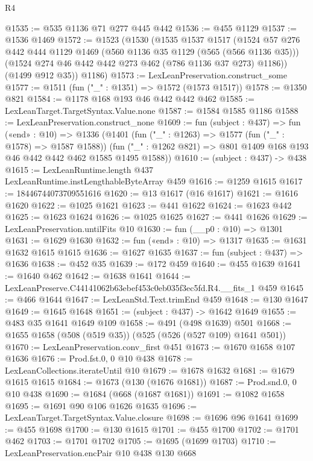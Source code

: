 \begin{lexlean}{R4}
\begin{coremodule}
@1535 := @535 @1136 @71 @277 @445 @442
@1536 := @455 @1129
@1537 := @1536 @1469
@1572 := @1523
    (@1530
      (@1535
        @1537
        @1517
        (@1524
          @57
          @276
          @442
          @444
          @1129
          @1469
          (@560 @1136 @35 @1129 (@565 (@566 @1136 @35)))
          (@1524 @274 @46 @442 @442 @273 @462 (@786 @1136 @37 @273) @1186))
        (@1499 @912 @35))
      @1186)
@1573 := LexLeanPreservation.construct_some
@1577 := @1511 (fun ("_" : @1351) => @1572 (@1573 @1517))
@1578 := @1350 @821
@1584 := @1178 @168 @193 @46 @442 @442 @462
@1585 := LexLeanTarget.TargetSyntax.Value.none
@1587 := @1584 @1585 @1186
@1588 := LexLeanPreservation.construct_none
@1609 := fun (subject : @437) =>
  fun («end» : @10) =>
  @1336
    (@1401
      (fun ("_" : @1263) => @1577 (fun ("_" : @1578) => @1587 @1588))
      (fun ("_" : @1262 @821) => @801 @1409 @168 @193 @46 @442 @442 @462 @1585 @1495 @1588))
@1610 := (subject : @437) -> @438
@1615 := LexLeanRuntime.length @437 LexLeanRuntime.instLengthableByteArray @459
@1616 := @1259 @1615
@1617 := 18446744073709551616
@1620 := @13 @1617 (@16 @1617)
@1621 := @1616 @1620
@1622 := @1025 @1621
@1623 := @441 @1622
@1624 := @1623 @442
@1625 := @1623 @1624
@1626 := @1025 @1625
@1627 := @441 @1626
@1629 := LexLeanPreservation.untilFits @10
@1630 := fun (__p0 : @10) => @1301
@1631 := @1629 @1630
@1632 := fun («end» : @10) => @1317
@1635 := @1631 @1632 @1615 @1615
@1636 := @1627 @1635
@1637 := fun (subject : @437) => @1636
@1638 := @452 @35
@1639 := @172 @459
@1640 := @455 @1639
@1641 := @1640 @462
@1642 := @1638 @1641
@1644 := LexLeanPreserve.C44141062b63ebef453c0eb035f3ec5fd.R4.__fits_1 @459
@1645 := @466 @1644
@1647 := LexLeanStd.Text.trimEnd @459
@1648 := @130 @1647
@1649 := @1645 @1648
@1651 := (subject : @437) -> @1642 @1649
@1655 := @483 @35 @1641 @1649 @109
@1658 := @491 (@498 @1639) @501
@1668 := @1655 @1658 (@508 (@519 @35)) (@525 (@526 (@527 @109) @1641 @501))
@1670 := LexLeanPreservation.conv_first @451
@1673 := @1670 @1658 @107 @1636
@1676 := Prod.fst.{0, 0} @10 @438
@1678 := LexLeanCollections.iterateUntil @10
@1679 := @1678 @1632
@1681 := @1679 @1615 @1615
@1684 := @1673 (@130 (@1676 @1681))
@1687 := Prod.snd.{0, 0} @10 @438
@1690 := @1684 (@668 (@1687 @1681))
@1691 := @1082 @1658
@1695 := @1691 @90 @106 @1626 @1635
@1696 := LexLeanTarget.TargetSyntax.Value.closure
@1698 := @1696 @96 @1641
@1699 := @455 @1698
@1700 := @130 @1615
@1701 := @455 @1700
@1702 := @1701 @462
@1703 := @1701 @1702
@1705 := @1695 (@1699 @1703)
@1710 := LexLeanPreservation.encPair @10 @438 @130 @668

\end{coremodule}
\end{lexlean}
